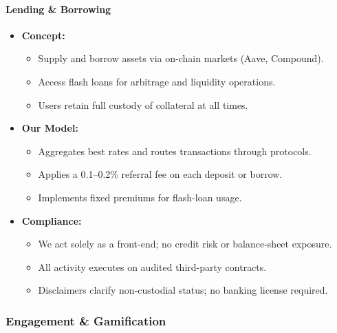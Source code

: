 \documentclass[13pt]{extarticle}
\begin{document}
\paragraph{Lending \& Borrowing}
\begin{itemize}[left=1em]
  \item \textbf{Concept:}
    \begin{itemize}[left=1.2em]
      \item Supply and borrow assets via on-chain markets (Aave, Compound).
      \item Access flash loans for arbitrage and liquidity operations.
      \item Users retain full custody of collateral at all times.
    \end{itemize}
  \item \textbf{Our Model:}
    \begin{itemize}[left=1.2em]
      \item Aggregates best rates and routes transactions through protocols.
      \item Applies a 0.1–0.2\% referral fee on each deposit or borrow.
      \item Implements fixed premiums for flash-loan usage.
    \end{itemize}
  \item \textbf{Compliance:}
    \begin{itemize}[left=1.2em]
      \item We act solely as a front-end; no credit risk or balance-sheet exposure.
      \item All activity executes on audited third-party contracts.
      \item Disclaimers clarify non-custodial status; no banking license required.
    \end{itemize}
\end{itemize}

\subsubsection{Engagement \& Gamification}
\end{document}
